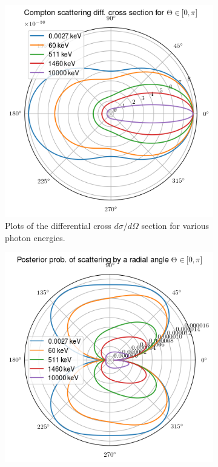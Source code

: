 \documentclass[a4paper,12pt,titlepage, twoside]{article}
\begin{document}
\begin{figure}[ht]
  \centering
  \begin{subfigure}{0.32\textwidth}
    \includegraphics[width=1.0\textwidth]{./fig/klein_nishina_1.png}
    \caption{Plots of the differential cross $d\sigma/d\Omega$ section for various photon energies.}
    \label{fig:klein_1}
  \end{subfigure}
  \begin{subfigure}{0.32\textwidth}
    \includegraphics[width=1.0\textwidth]{./fig/klein_nishina_2.png}

\end{subfigure}
\end{figure}
\end{document}

